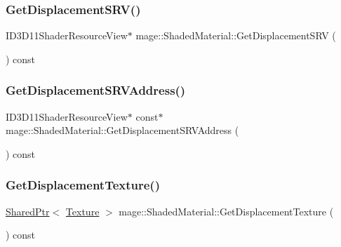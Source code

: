 \hypertarget{structmage_1_1_shaded_material_ac33beb240df46ad6295425851cafc996}{}\label{structmage_1_1_shaded_material_ac33beb240df46ad6295425851cafc996} 
\subsubsection{\texorpdfstring{Get\+Displacement\+S\+R\+V()}{GetDisplacementSRV()}}
{\footnotesize\ttfamily I\+D3\+D11\+Shader\+Resource\+View$\ast$ mage\+::\+Shaded\+Material\+::\+Get\+Displacement\+S\+RV (\begin{DoxyParamCaption}{ }\end{DoxyParamCaption}) const\hspace{0.3cm}{\ttfamily [noexcept]}}

\hypertarget{structmage_1_1_shaded_material_afc31aec2b4532b196306db049c3dddf6}{}\label{structmage_1_1_shaded_material_afc31aec2b4532b196306db049c3dddf6} 
\subsubsection{\texorpdfstring{Get\+Displacement\+S\+R\+V\+Address()}{GetDisplacementSRVAddress()}}
{\footnotesize\ttfamily I\+D3\+D11\+Shader\+Resource\+View$\ast$ const$\ast$ mage\+::\+Shaded\+Material\+::\+Get\+Displacement\+S\+R\+V\+Address (\begin{DoxyParamCaption}{ }\end{DoxyParamCaption}) const\hspace{0.3cm}{\ttfamily [noexcept]}}

\hypertarget{structmage_1_1_shaded_material_acf3273d75933ca238075150dd7cc7dca}{}\label{structmage_1_1_shaded_material_acf3273d75933ca238075150dd7cc7dca} 
\subsubsection{\texorpdfstring{Get\+Displacement\+Texture()}{GetDisplacementTexture()}}
{\footnotesize\ttfamily \hyperlink{namespacemage_a1e01ae66713838a7a67d30e44c67703e}{Shared\+Ptr}$<$ \hyperlink{classmage_1_1_texture}{Texture} $>$ mage\+::\+Shaded\+Material\+::\+Get\+Displacement\+Texture (\begin{DoxyParamCaption}{ }\end{DoxyParamCaption}) const\hspace{0.3cm}{\ttfamily [noexcept]}}

